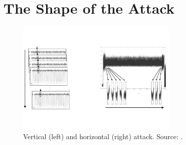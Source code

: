 \section{The Shape of the Attack}\label{sec:form}
\begin{figure}
\centering
\includegraphics[width=0.7\textwidth]{../Figures/horizontal_vertical.pdf} 
\caption[Vertical and horizontal attacks.]{Vertical (left) and horizontal (right) attack. Source: \cite{clavier2010horizontal}.}\label{fig:vert_hor}
\end{figure}
